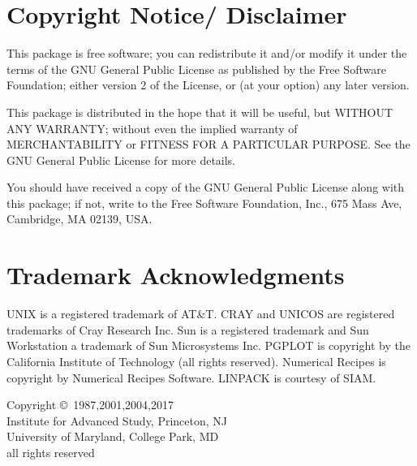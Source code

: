 \small
\section*{Copyright Notice/ Disclaimer}

This package is free software; you can redistribute it and/or modify
it under the terms of the GNU General Public License as published by
the Free Software Foundation; either version 2 of the License, or
(at your option) any later version.

This package is distributed in the hope that it will be useful,
but WITHOUT ANY WARRANTY; without even the implied warranty of
MERCHANTABILITY or FITNESS FOR A PARTICULAR PURPOSE.  See the
GNU General Public License for more details.

You should have received a copy of the GNU General Public License
along with this package; if not, write to the Free Software
Foundation, Inc., 675 Mass Ave, Cambridge, MA 02139, USA.


\section*{Trademark Acknowledgments}
UNIX is a registered trademark of AT\&T.
CRAY and UNICOS are registered trademarks of Cray Research Inc.
Sun is a registered trademark and Sun Workstation a trademark of Sun
Microsystems Inc.
PGPLOT is copyright by the California Institute of Technology (all
rights reserved).
Numerical Recipes is copyright by Numerical Recipes Software.
LINPACK is courtesy of SIAM.


\begin{center}
\vspace{2 in}
Copyright \copyright\ 1987,2001,2004,2017\\
Institute for Advanced Study, Princeton, NJ\\
University of Maryland, College Park, MD\\
all rights reserved
\end{center}
\normalsize
\vspace*{\fill}
\cleardoublepage
\pagestyle{headings}
\tableofcontents
\newpage
{}
\listoftables
\newpage
{}
\listoffigures
\newpage

